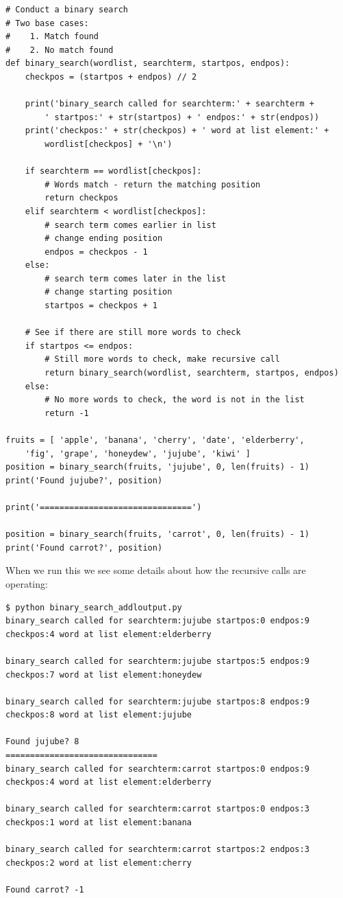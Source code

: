 \beforeverb
\begin{verbatim}
# Conduct a binary search
# Two base cases:
#    1. Match found
#    2. No match found
def binary_search(wordlist, searchterm, startpos, endpos):
    checkpos = (startpos + endpos) // 2

    print('binary_search called for searchterm:' + searchterm +  
        ' startpos:' + str(startpos) + ' endpos:' + str(endpos))
    print('checkpos:' + str(checkpos) + ' word at list element:' + 
        wordlist[checkpos] + '\n')

    if searchterm == wordlist[checkpos]:
        # Words match - return the matching position
        return checkpos
    elif searchterm < wordlist[checkpos]:
        # search term comes earlier in list
        # change ending position
        endpos = checkpos - 1
    else:
        # search term comes later in the list
        # change starting position
        startpos = checkpos + 1

    # See if there are still more words to check
    if startpos <= endpos:
        # Still more words to check, make recursive call
        return binary_search(wordlist, searchterm, startpos, endpos)
    else:
        # No more words to check, the word is not in the list
        return -1

fruits = [ 'apple', 'banana', 'cherry', 'date', 'elderberry',
    'fig', 'grape', 'honeydew', 'jujube', 'kiwi' ]
position = binary_search(fruits, 'jujube', 0, len(fruits) - 1)
print('Found jujube?', position)
    
print('===============================')

position = binary_search(fruits, 'carrot', 0, len(fruits) - 1)
print('Found carrot?', position)
\end{verbatim}
\afterverb

When we run this we see some details about how the recursive calls are operating:

\beforeverb
\begin{verbatim}
$ python binary_search_addloutput.py 
binary_search called for searchterm:jujube startpos:0 endpos:9
checkpos:4 word at list element:elderberry

binary_search called for searchterm:jujube startpos:5 endpos:9
checkpos:7 word at list element:honeydew

binary_search called for searchterm:jujube startpos:8 endpos:9
checkpos:8 word at list element:jujube

Found jujube? 8
===============================
binary_search called for searchterm:carrot startpos:0 endpos:9
checkpos:4 word at list element:elderberry

binary_search called for searchterm:carrot startpos:0 endpos:3
checkpos:1 word at list element:banana

binary_search called for searchterm:carrot startpos:2 endpos:3
checkpos:2 word at list element:cherry

Found carrot? -1
\end{verbatim}
\afterverb

